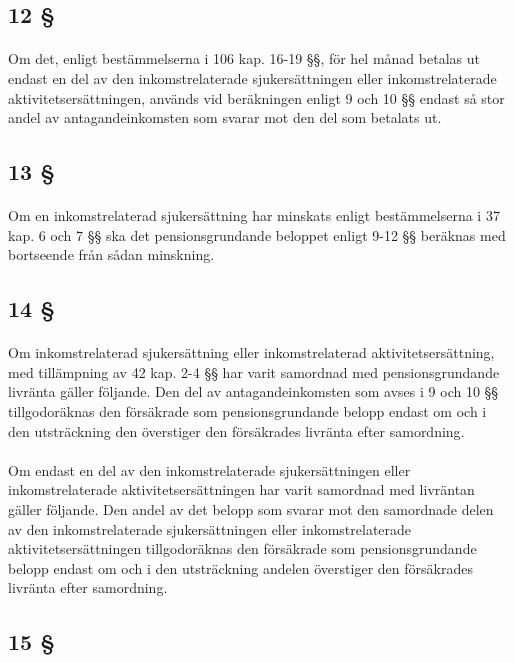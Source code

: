 \documentclass[a4paper,notitlepage,openany,10pt]{book}
\begin{document}
\subsection*{12 §}
\paragraph*{}
Om det, enligt bestämmelserna i 106 kap. 16-19 §§, för hel månad betalas ut endast en del av den inkomstrelaterade sjukersättningen eller inkomstrelaterade aktivitetsersättningen, används vid beräkningen enligt 9 och 10 §§ endast så stor andel av antagandeinkomsten som svarar mot den del som betalats ut.
\subsection*{13 §}
\paragraph*{}
Om en inkomstrelaterad sjukersättning har minskats enligt bestämmelserna i 37 kap. 6 och 7 §§ ska det pensionsgrundande beloppet enligt 9-12 §§ beräknas med bortseende från sådan minskning.
\subsection*{14 §}
\paragraph*{}
Om inkomstrelaterad sjukersättning eller inkomstrelaterad aktivitetsersättning, med tillämpning av 42 kap. 2-4 §§ har varit samordnad med pensionsgrundande livränta gäller följande. Den del av antagandeinkomsten som avses i 9 och 10 §§ tillgodoräknas den försäkrade som pensionsgrundande belopp endast om och i den utsträckning den överstiger den försäkrades livränta efter samordning.
\paragraph*{}
Om endast en del av den inkomstrelaterade sjukersättningen eller inkomstrelaterade aktivitetsersättningen har varit samordnad med livräntan gäller följande. Den andel av det belopp som svarar mot den samordnade delen av den inkomstrelaterade sjukersättningen eller inkomstrelaterade aktivitetsersättningen tillgodoräknas den försäkrade som pensionsgrundande belopp endast om och i den utsträckning andelen överstiger den försäkrades livränta efter samordning.
\subsection*{15 §}
\end{document}
